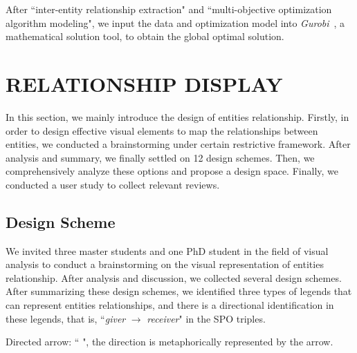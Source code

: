 \documentclass[review,journal]{vgtc}         %
\begin{document}
After ``inter-entity relationship extraction" and ``multi-objective optimization algorithm modeling", we input the data and optimization model into \textit{Gurobi}~\cite{noauthor_gurobi_nodate}, a mathematical solution tool, to obtain the global optimal solution.

\section{RELATIONSHIP DISPLAY}
\noindent In this section, we mainly introduce the design of entities relationship. Firstly, in order to design effective visual elements to map the relationships between entities, we conducted a brainstorming under certain restrictive framework. After analysis and summary, we finally settled on 12 design schemes. Then, we comprehensively analyze these options and propose a design space. Finally, we conducted a user study to collect relevant reviews.
\subsection{Design Scheme}
\noindent We invited three master students and one PhD student in the field of visual analysis to conduct a brainstorming on the visual representation of entities relationship. After analysis and discussion, we collected several design schemes. After summarizing these design schemes, we identified three types of legends that can represent entities relationships, and there is a directional identification in these legends, that is, ``\textit{giver} $\rightarrow$ \textit{receiver}" in the SPO triples.

 Directed arrow:  ``  ", the direction is metaphorically represented by the arrow.
\end{document}
